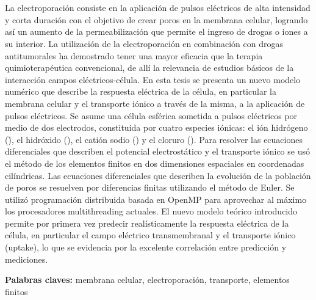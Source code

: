 \chapter*{\runtitulo}

\noindent 
La electroporación consiste en la aplicación de pulsos eléctricos de alta intensidad y corta duración con el objetivo de crear poros en la membrana celular, logrando así un aumento de la permeabilización que permite el ingreso de drogas o iones a su interior. La utilización de la electroporación en combinación con drogas antitumorales ha demostrado tener una mayor eficacia que la terapia quimioterapéutica convencional, de allí la relevancia de estudios básicos de la interacción campos eléctricos-célula. En esta tesis se presenta un nuevo modelo numérico que describe la respuesta eléctrica de la célula, en particular la membrana celular y el transporte iónico a través de la misma, a la aplicación de pulsos eléctricos. Se asume una célula esférica sometida a pulsos eléctricos por medio de dos electrodos, constituida por cuatro especies iónicas: el ión hidrógeno (\h), el hidróxido (\oh), el catión sodio (\na) y el cloruro (\cl). Para resolver las ecuaciones diferenciales que describen el potencial electrostático y el transporte iónico se usó el método de los elementos finitos en dos dimensiones espaciales en coordenadas cilíndricas. Las ecuaciones diferenciales que describen la evolución de la población de poros se resuelven por diferencias finitas utilizando el método de Euler. Se utilizó programación distribuida basada en OpenMP para aprovechar al máximo los procesadores multithreading actuales. El nuevo modelo teórico introducido permite  por primera vez  predecir realísticamente la respuesta eléctrica de la célula, en particular el campo eléctrico transmembranal y el transporte iónico (uptake), lo que se evidencia por la excelente correlación entre predicción y mediciones.


\bigskip

\noindent\textbf{Palabras claves:} membrana celular, electroporación, transporte, elementos finitos